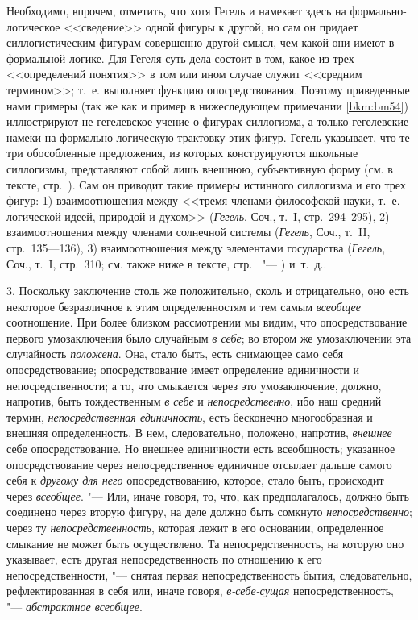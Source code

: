 {{{Необходимо, впрочем, отметить, что хотя Гегель и намекает здесь на
формально-логическое <<сведение>> одной фигуры к
другой, но сам он придает силлогистическим фигурам совершенно другой смысл,
чем какой они имеют в формальной логике. Для Гегеля суть дела состоит в
том, какое из трех <<определений понятия>> в том или ином случае служит
<<средним термином>>; т.~е. выполняет функцию опосредствования. Поэтому
приведенные нами примеры (так же как и пример в нижеследующем примечании
\ref{bkm:bm54}) иллюстрируют не гегелевское учение о
фигурах силлогизма, а только гегелевские намеки на формально-логическую
трактовку этих фигур. Гегель указывает, что те три обособленные
предложения, из которых конструируются школьные силлогизмы, представляют
собой лишь внешнюю, субъективную форму (см. в тексте,
стр.~\pageref{bkm:bm52a}). Сам он приводит такие примеры
истинного силлогизма и его трех фигур: 1) взаимоотношения между <<тремя
членами философской науки, т.~е. логической идеей, природой и духом>>
({\em Гегель}, Соч., т.~I, стр.~294--295), 2) взаимоотношения между членами
солнечной системы ({\em Гегель}, Соч., т.~II, стр.~135---136),
3) взаимоотношения между элементами государства ({\em Гегель},
Соч., т.~I, стр.~310; см. также ниже в тексте,
стр.~\pageref{bkm:bm52b} "--- \pageref{bkm:bm52c}) и~т.~д.\label{bkm:bm52}}.

3. Поскольку заключение столь же положительно, сколь и
отрицательно, оно есть некоторое безразличное к этим определенностям и тем
самым {\em всеобщее} соотношение. При более близком рассмотрении мы видим, что
опосредствование первого умозаключения было случайным {\em в себе}; во втором
же умозаключении эта случайность {\em положена}. Она,
стало быть, есть снимающее само себя опосредствование; опосредствование
имеет определение единичности и непосредственности; а то, что смыкается
через это умозаключение, должно, напротив, быть тождественным
{\em в себе} и {\em непосредственно}, ибо наш средний термин,
{\em непосредственная единичность},
есть бесконечно многообразная и внешняя определенность. В
нем, следовательно, положено, напротив, {\em внешнее} себе
опосредствование. Но внешнее единичности есть всеобщность; указанное
опосредствование через непосредственное единичное отсылает дальше самого
себя к {\em другому для него}
опосредствованию, которое, стало быть, происходит через
{\em всеобщее}. "--- Или,
иначе говоря, то, что, как предполагалось, должно быть соединено через
вторую фигуру, на деле должно быть сомкнуто {\em непосредственно};
через ту {\em непосредственность},
которая лежит в его основании, определенное смыкание не может
быть осуществлено. Та непосредственность, на которую оно указывает, есть
другая непосредственность по отношению к его непосредственности, "---
снятая первая непосредственность бытия, следовательно,
рефлектированная в себя или, иначе говоря,
{\em в-себе-сущая}
непосредственность, "---
{\em абстрактное всеобщее}.

}}
